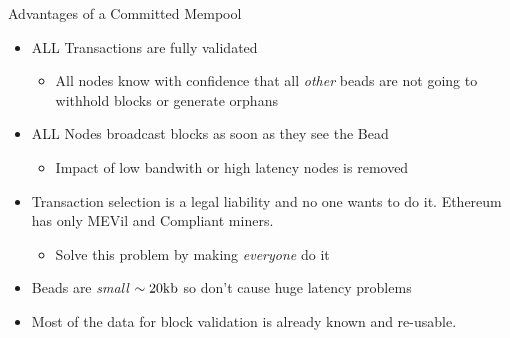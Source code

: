 \documentclass[tikz,mathserif,usenames,dvipsnames,svgnames,table]{beamer}
\newlength{\wideitemsep}
\let\olditem\item
\renewcommand{\item}{\setlength{\itemsep}{\wideitemsep}\olditem}
\begin{document}
\begin{frame}{Advantages of a Committed Mempool}
    \begin{itemize}
        \item ALL Transactions are fully validated
            \begin{itemize}
                \item[$\Rightarrow$] All nodes know with confidence that all {\it other} beads are
                    not going to withhold blocks or generate orphans
            \end{itemize}
        \item ALL Nodes broadcast blocks as soon as they see the Bead
            \begin{itemize}
                \item[$\Rightarrow$] Impact of low bandwith or high latency nodes is removed
            \end{itemize}
        \item Transaction selection is a legal liability and no one wants to do it. Ethereum has
            only MEVil and Compliant miners.
            \begin{itemize}
                \item[$\Rightarrow$] Solve this problem by making {\it everyone} do it
            \end{itemize}
        \item Beads are {\it small} $\sim 20{\rm kb}$ so don't cause huge latency problems
        \item Most of the data for block validation is already known and re-usable.
    \end{itemize}
\end{frame}
\end{document}
